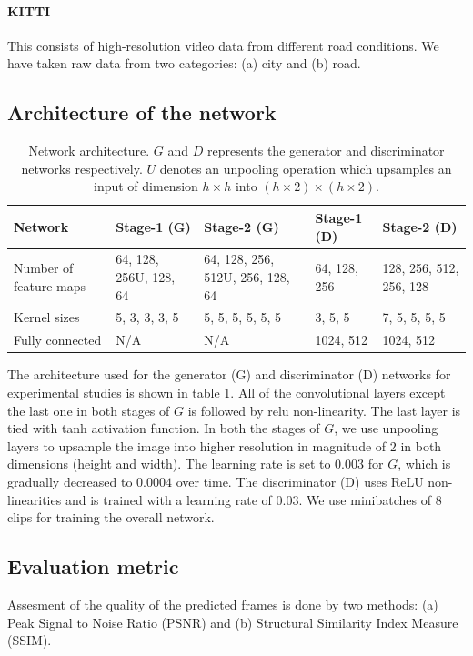 \documentclass{article}
\begin{document}
  \paragraph{KITTI} This consists of high-resolution video data from different road conditions. We have taken raw data from two categories: (a) city and (b) road.

\subsection{Architecture of the network}

  \begin{table}[!htbp]
  	\caption{Network architecture. $ G $ and $ D $ represents the generator and discriminator networks respectively. $ U $ denotes an unpooling operation which upsamples an input of dimension $ h \times h $ into $ (h \times 2) \times (h \times 2) $.}
  	\centering
  	\begin{tabular}{p{2.3cm}p{3cm}p{2.5cm}p{2cm}p{2cm}}
  		\hline
  		Network & Stage-1 (G) & Stage-2 (G) & Stage-1 (D) & Stage-2 (D)\\
  		\hline
  		Number of feature maps & 64, 128, 256U, 128, 64 & 64, 128, 256, 512U, 256, 128, 64 & 64, 128, 256 & 128, 256, 512, 256, 128 \\
  		\hline
  		Kernel sizes & 5, 3, 3, 3, 5 & 5, 5, 5, 5, 5, 5 & 3, 5, 5  & 7, 5, 5, 5, 5  \\
  		\hline
  		Fully connected & N/A & N/A & 1024, 512 & 1024, 512 \\
  		\hline
  	\end{tabular}
  	\label{tab:arch}
  \end{table}

The architecture used for the generator (G) and discriminator (D) networks for experimental studies is shown in table \ref{tab:arch}. All of the convolutional layers except the last one in both stages of $ G $ is followed by relu non-linearity. The last layer is tied with tanh activation function. In both the stages of $ G $, we use unpooling layers to upsample the image into higher resolution in magnitude of $ 2 $ in both dimensions (height and width). The learning rate is set to $ 0.003 $ for $ G $, which is gradually decreased to $ 0.0004 $ over time. The discriminator (D) uses ReLU non-linearities and is trained with a learning rate of $ 0.03 $. We use minibatches of 8 clips for training the overall network.

\subsection{Evaluation metric}
  Assesment of the quality of the predicted frames is done by two methods:
  (a) Peak Signal to Noise Ratio (PSNR) and (b) Structural Similarity Index Measure (SSIM).
\end{document}
